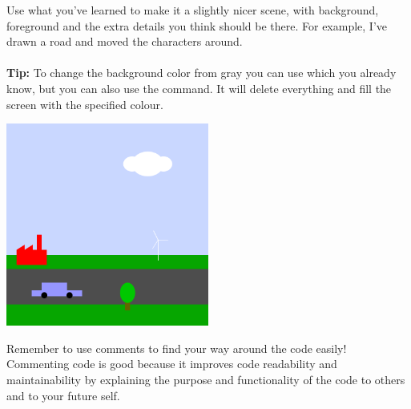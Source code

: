 \begin{exercisebox}[adjusted title=Green City]

Use what you've learned to make it a slightly nicer scene, with background, foreground and the extra details you think should be there. For example, I've drawn a road and moved the characters around. 
\\
\\
\textbf{Tip: }To change the background color from gray you can use  which you
already know, but you can also use the  command.
It will delete everything and fill the screen with the specified colour.

\begin{center}
\includegraphics[width=0.5\textwidth]{illustrationer/elbil.png}
\end{center}

\noindent
Remember to use comments to find your way around the code easily!
Commenting code is good because it improves code readability and maintainability by explaining the purpose and functionality of the code to others and to your future self.



\end{exercisebox}
